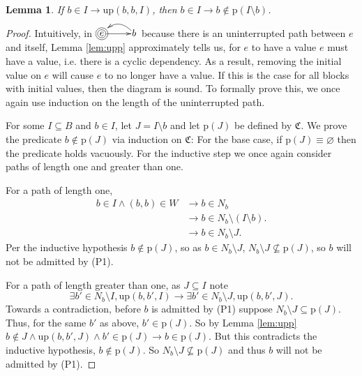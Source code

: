 \documentclass[twocolumn]{article}
\newtheorem{lemma}{Lemma}
\newcommand*{\Inputs}[1]{N_{#1}}
\begin{document}
\begin{lemma} \label{lem:soundness}
    If $b\in I \rightarrow \text{up}(b, b, I)$, then $b\in I\rightarrow b\not\in\text{p}(I\setminus b)$.
\end{lemma}
\begin{proof}
    Intuitively, in $\xymatrix@1{*++++[o][F=]{e} \ar[r] & b \ar@/_1em/[l]}$ because there is an uninterrupted path between $e$ and itself, Lemma \ref{lem:upp} approximately tells us, for $e$ to have a value $e$ must have a value, i.e. there is a cyclic dependency. As a result, removing the initial value on $e$ will cause $e$ to no longer have a value. If this is the case for all blocks with initial values, then the diagram is sound. To formally prove this, we once again use induction on the length of the uninterrupted path.

        For some $I\subseteq B$ and $b\in I$, let $J=I\setminus b$ and let $\text{p}(J)$ be defined by $\mathfrak{C}$. We prove the predicate $b\not\in\text{p}(J)$ via induction on $\mathfrak{C}$: For the base case, if $\text{p}(J)\equiv\varnothing$ then the predicate holds vacuously. For the inductive step we once again consider paths of length one and greater than one.

        For a path of length one,
        \[
        \begin{aligned}
            b\in I\land (b, b)\in W &\rightarrow b\in \Inputs{b} \\
            &\rightarrow b\in\Inputs{b}\setminus (I\setminus b). \\
            &\rightarrow b\in\Inputs{b}\setminus J.
        \end{aligned}
        \]
        Per the inductive hypothesis $b\not\in\text{p}(J)$, so as $b\in \Inputs{b}\setminus J$, $\Inputs{b}\setminus J\not\subseteq\text{p}(J)$, so $b$ will not be admitted by (P1).

        For a path of length greater than one, as $J\subseteq I$ note
        \[
            \exists b'\in\Inputs{b}\setminus I, \text{up}(b, b', I)
            \rightarrow \exists b'\in\Inputs{b}\setminus J, \text{up}(b, b', J).
        \]
        Towards a contradiction, before $b$ is admitted by (P1) suppose $\Inputs{b}\setminus J \subseteq \text{p}(J)$. Thus, for the same $b'$ as above, $b'\in\text{p}(J)$. So by Lemma \ref{lem:upp} $b\not\in J\land \text{up}(b, b', J) \land b'\in\text{p}(J) \rightarrow b\in \text{p}(J)$. But this contradicts the inductive hypothesis, $b\not\in\text{p}(J)$. So $\Inputs{b}\setminus J \not\subseteq \text{p}(J)$ and thus $b$ will not be admitted by (P1).
\end{proof}
\end{document}
